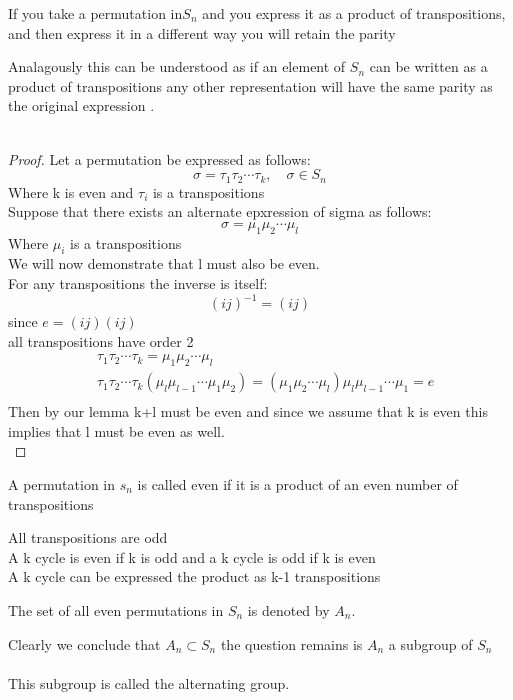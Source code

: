 \documentclass[11pt]{article}
\theoremstyle{definition}  %
\newcommand{\block}[2]{\begin{tcolorbox}[title={#1}]{#2}\end{tcolorbox}}
\begin{document}
\block{Theorem:Parity preserving property of cycles}{
 If you take a permutation in$S_n$ and you express it as a product of transpositions, and then express it in a different way you will retain the parity
}
Analagously this can be understood as if an element of $S_n$ can be written as a product of transpositions any other representation will  have the same parity as the original expression . \\\\
\begin{proof}
  Let a permutation be expressed as follows:
  \[
    \sigma=\tau_1\tau_2\cdots \tau_k,\quad  \sigma \in S_n
  \]
  Where k is even and $\tau_i$ is a transpositions\\
  Suppose that there exists an alternate epxression of sigma as follows:
  \[
  \sigma=\mu_1\mu_2\cdots \mu_l
  \]
  Where $\mu_i$ is a transpositions\\
  We will now demonstrate that l must also be even. \\
  For any transpositions the inverse is itself:
  \[
    (ij)^{-1}=(ij)
  \]
  since $e=(ij)(ij)$\\
  all transpositions have order 2\\
  \begin{align*}
    &\tau_1\tau_2\cdots \tau_k=\mu_1\mu_2\cdots \mu_l\\
    &\tau_1\tau_2\cdots \tau_k(\mu_l\mu_{l-1}\cdots \mu_1\mu_2)=(\mu_1\mu_2\cdots \mu_l)\mu_l\mu_{l-1}\cdots \mu_1=e\\
  \end{align*}
Then by our lemma k+l must be even and since we assume that k is even this implies that l must be even as well. \\

\end{proof}
\block{Definition: Even permutation}{
A permutation in $s_n$ is called even if it is a  product of an even number of transpositions
}
All transpositions are odd\\
A k cycle is even if k is odd and a k cycle is odd if k is even\\
A k cycle can be expressed the product as k-1 transpositions\\
\block{Definition: Set of all even permutations}{
The set of all even permutations in $S_n$ is denoted by $A_n$.
}
Clearly we conclude that $A_n\subset S_n$ the question remains is $A_n$ a subgroup of $S_n$\\\\
This subgroup is called the alternating group. \\
\end{document}
